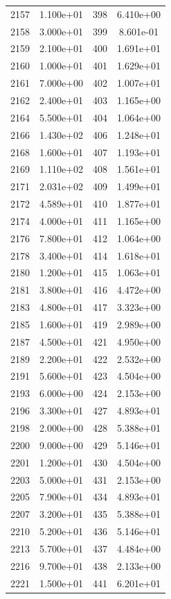 \documentclass[12pt]{article}
\begin{document}
\begin{longtable}{@{}cccc@{}}
2157 & 1.100e+01 & 398 & 6.410e+00 \\
2158 & 3.000e+01 & 399 & 8.601e-01 \\
2159 & 2.100e+01 & 400 & 1.691e+01 \\
2160 & 1.000e+01 & 401 & 1.629e+01 \\
2161 & 7.000e+00 & 402 & 1.007e+01 \\
2162 & 2.400e+01 & 403 & 1.165e+00 \\
2164 & 5.500e+01 & 404 & 1.064e+00 \\
2166 & 1.430e+02 & 406 & 1.248e+01 \\
2168 & 1.600e+01 & 407 & 1.193e+01 \\
2169 & 1.110e+02 & 408 & 1.561e+01 \\
2171 & 2.031e+02 & 409 & 1.499e+01 \\
2172 & 4.589e+01 & 410 & 1.877e+01 \\
2174 & 4.000e+01 & 411 & 1.165e+00 \\
2176 & 7.800e+01 & 412 & 1.064e+00 \\
2178 & 3.400e+01 & 414 & 1.618e+01 \\
2180 & 1.200e+01 & 415 & 1.063e+01 \\
2181 & 3.800e+01 & 416 & 4.472e+00 \\
2183 & 4.800e+01 & 417 & 3.323e+00 \\
2185 & 1.600e+01 & 419 & 2.989e+00 \\
2187 & 4.500e+01 & 421 & 4.950e+00 \\
2189 & 2.200e+01 & 422 & 2.532e+00 \\
2191 & 5.600e+01 & 423 & 4.504e+00 \\
2193 & 6.000e+00 & 424 & 2.153e+00 \\
2196 & 3.300e+01 & 427 & 4.893e+01 \\
2198 & 2.000e+00 & 428 & 5.388e+01 \\
2200 & 9.000e+00 & 429 & 5.146e+01 \\
2201 & 1.200e+01 & 430 & 4.504e+00 \\
2203 & 5.000e+01 & 431 & 2.153e+00 \\
2205 & 7.900e+01 & 434 & 4.893e+01 \\
2207 & 3.200e+01 & 435 & 5.388e+01 \\
2210 & 5.200e+01 & 436 & 5.146e+01 \\
2213 & 5.700e+01 & 437 & 4.484e+00 \\
2216 & 9.700e+01 & 438 & 2.133e+00 \\
2221 & 1.500e+01 & 441 & 6.201e+01 \\

\end{longtable}
\end{document}
